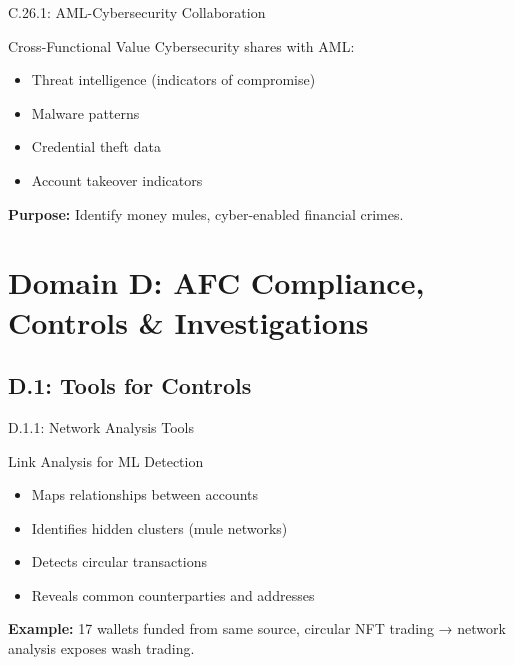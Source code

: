 \documentclass{beamer}
\begin{document}
		\begin{frame}{C.26.1: AML-Cybersecurity Collaboration}
			\begin{block}{Cross-Functional Value}
				Cybersecurity shares with AML:
				\begin{itemize}
					\item Threat intelligence (indicators of compromise)
					\item Malware patterns
					\item Credential theft data
					\item Account takeover indicators
				\end{itemize}
			\end{block}
			\textbf{Purpose:} Identify money mules, cyber-enabled financial crimes.
		\end{frame}
		
		
		\section{Domain D: AFC Compliance, Controls \& Investigations}
		
		\subsection{D.1: Tools for Controls}
		
		\begin{frame}{D.1.1: Network Analysis Tools}
			\begin{block}{Link Analysis for ML Detection}
				\begin{itemize}
					\item Maps relationships between accounts
					\item Identifies hidden clusters (mule networks)
					\item Detects circular transactions
					\item Reveals common counterparties and addresses
				\end{itemize}
			\end{block}
			\textbf{Example:} 17 wallets funded from same source, circular NFT trading → network analysis exposes wash trading.
		\end{frame}
		
\end{document}
